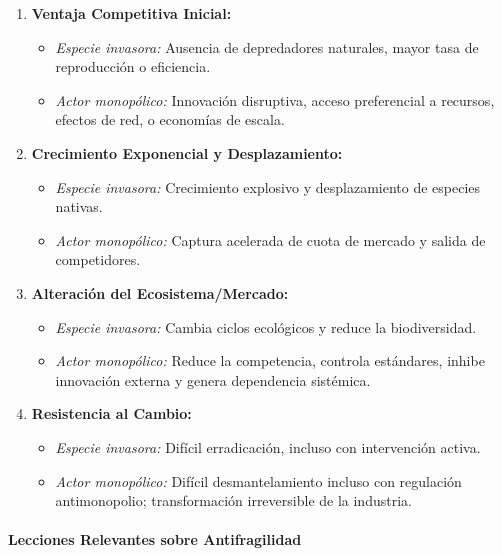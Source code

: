 \documentclass[a4paper,12pt]{article}
\begin{document}
\begin{enumerate}
    \item \textbf{Ventaja Competitiva Inicial:}
    \begin{itemize}
        \item \textit{Especie invasora:} Ausencia de depredadores naturales, mayor tasa de reproducción o eficiencia.
        \item \textit{Actor monopólico:} Innovación disruptiva, acceso preferencial a recursos, efectos de red, o economías de escala.
    \end{itemize}

    \item \textbf{Crecimiento Exponencial y Desplazamiento:}
    \begin{itemize}
        \item \textit{Especie invasora:} Crecimiento explosivo y desplazamiento de especies nativas.
        \item \textit{Actor monopólico:} Captura acelerada de cuota de mercado y salida de competidores.
    \end{itemize}

    \item \textbf{Alteración del Ecosistema/Mercado:}
    \begin{itemize}
        \item \textit{Especie invasora:} Cambia ciclos ecológicos y reduce la biodiversidad.
        \item \textit{Actor monopólico:} Reduce la competencia, controla estándares, inhibe innovación externa y genera dependencia sistémica.
    \end{itemize}

    \item \textbf{Resistencia al Cambio:}
    \begin{itemize}
        \item \textit{Especie invasora:} Difícil erradicación, incluso con intervención activa.
        \item \textit{Actor monopólico:} Difícil desmantelamiento incluso con regulación antimonopolio; transformación irreversible de la industria.
    \end{itemize}
\end{enumerate}

\paragraph{Lecciones Relevantes sobre Antifragilidad}
\end{document}
